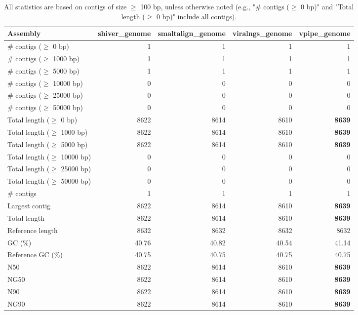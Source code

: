 \documentclass[12pt,a4paper]{article}
\begin{document}
\begin{table}[ht]
\begin{center}
\caption{All statistics are based on contigs of size $\geq$ 100 bp, unless otherwise noted (e.g., "\# contigs ($\geq$ 0 bp)" and "Total length ($\geq$ 0 bp)" include all contigs).}
\begin{tabular}{|l*{4}{|r}|}
\hline
Assembly & shiver\_genome & smaltalign\_genome & viralngs\_genome & vpipe\_genome \\ \hline
\# contigs ($\geq$ 0 bp) & 1 & 1 & 1 & 1 \\ \hline
\# contigs ($\geq$ 1000 bp) & 1 & 1 & 1 & 1 \\ \hline
\# contigs ($\geq$ 5000 bp) & 1 & 1 & 1 & 1 \\ \hline
\# contigs ($\geq$ 10000 bp) & 0 & 0 & 0 & 0 \\ \hline
\# contigs ($\geq$ 25000 bp) & 0 & 0 & 0 & 0 \\ \hline
\# contigs ($\geq$ 50000 bp) & 0 & 0 & 0 & 0 \\ \hline
Total length ($\geq$ 0 bp) & 8622 & 8614 & 8610 & {\bf 8639} \\ \hline
Total length ($\geq$ 1000 bp) & 8622 & 8614 & 8610 & {\bf 8639} \\ \hline
Total length ($\geq$ 5000 bp) & 8622 & 8614 & 8610 & {\bf 8639} \\ \hline
Total length ($\geq$ 10000 bp) & 0 & 0 & 0 & 0 \\ \hline
Total length ($\geq$ 25000 bp) & 0 & 0 & 0 & 0 \\ \hline
Total length ($\geq$ 50000 bp) & 0 & 0 & 0 & 0 \\ \hline
\# contigs & 1 & 1 & 1 & 1 \\ \hline
Largest contig & 8622 & 8614 & 8610 & {\bf 8639} \\ \hline
Total length & 8622 & 8614 & 8610 & {\bf 8639} \\ \hline
Reference length & 8632 & 8632 & 8632 & 8632 \\ \hline
GC (\%) & 40.76 & 40.82 & 40.54 & 41.14 \\ \hline
Reference GC (\%) & 40.75 & 40.75 & 40.75 & 40.75 \\ \hline
N50 & 8622 & 8614 & 8610 & {\bf 8639} \\ \hline
NG50 & 8622 & 8614 & 8610 & {\bf 8639} \\ \hline
N90 & 8622 & 8614 & 8610 & {\bf 8639} \\ \hline
NG90 & 8622 & 8614 & 8610 & {\bf 8639} \\ \hline

\end{tabular}
\end{center}
\end{table}
\end{document}
